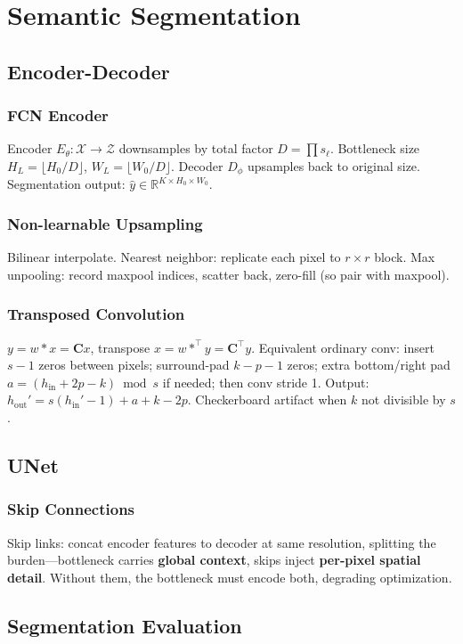 \section{Semantic Segmentation}
\subsection{Encoder-Decoder}
\subsubsection*{FCN Encoder}
Encoder $E_\theta:\mathcal{X}\to\mathcal{Z}$ downsamples by total factor $D=\prod s_\ell$. Bottleneck size $H_L=\lfloor H_0/D\rfloor$, $W_L=\lfloor W_0/D\rfloor$.
Decoder $D_\phi$ upsamples back to original size. Segmentation output: $\hat y\in\mathbb{R}^{K\times H_0\times W_0}$.

\subsubsection*{Non-learnable Upsampling}
Bilinear interpolate.
Nearest neighbor: replicate each pixel to $r\times r$ block.
Max unpooling: record maxpool indices, scatter back, zero-fill (so pair with maxpool).

\subsubsection*{Transposed Convolution}
$y=w*x=\mathbf{C}x$, transpose $x=w*^\top y=\mathbf{C}^\top y$.
Equivalent ordinary conv: insert $s-1$ zeros between pixels; surround-pad $k-p-1$ zeros; extra bottom/right pad $a=(h_{\text{in}}+2p-k)\bmod s$ if needed; then conv stride 1.
Output: $h_{\text{out}}'=s(h_{\text{in}}'-1)+a+k-2p$.
Checkerboard artifact when $k$ not divisible by $s$.

\subsection{UNet}
\subsubsection*{Skip Connections}
Skip links: concat encoder features to decoder at same resolution, splitting the burden—bottleneck carries \textbf{global context}, skips inject \textbf{per-pixel spatial detail}.
Without them, the bottleneck must encode both, degrading optimization.

\subsection{Segmentation Evaluation}
